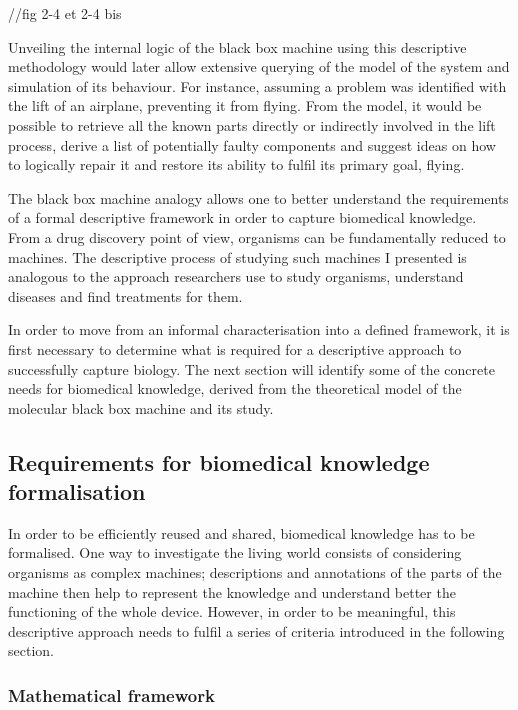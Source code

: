 //fig 2-4 et 2-4 bis

Unveiling the internal logic of the black box machine using this descriptive methodology would later allow extensive querying of the model of the system and simulation of its behaviour. For instance, assuming a problem was identified with the lift of an airplane, preventing it from flying. From the model, it would be possible to retrieve all the known parts directly or indirectly involved in the lift process, derive a list of potentially faulty components and suggest ideas on how to logically repair it and restore its ability to fulfil its primary goal, flying.

The black box machine analogy allows one to better understand the requirements of a formal descriptive framework in order to capture biomedical knowledge. From a drug discovery point of view, organisms can be fundamentally reduced to machines. The descriptive process of studying such machines I presented is analogous to the approach researchers use to study organisms, understand diseases and find treatments for them.

In order to move from an informal characterisation into a defined framework, it is first necessary to determine what is required for a descriptive approach to successfully capture biology. The next section will identify some of the concrete needs for biomedical knowledge, derived from the theoretical model of the molecular black box machine and its study.

\subsection{Requirements for biomedical knowledge formalisation}

In order to be efficiently reused and shared, biomedical knowledge has to be formalised. One way to investigate the living world consists of considering organisms as complex machines; descriptions and annotations of the parts of the machine then help to represent the knowledge and understand better the functioning of the whole device. However, in order to be meaningful, this descriptive approach needs to fulfil a series of criteria introduced in the following section.

\subsubsection{Mathematical framework}

